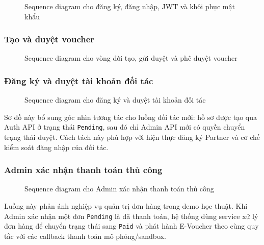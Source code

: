 \begin{figure}[H]
\centering
{}
\caption{Sequence diagram cho đăng ký, đăng nhập, JWT và khôi phục mật khẩu}
\end{figure}

\subsubsection{Tạo và duyệt voucher}

\begin{figure}[H]
\centering
{}
\caption{Sequence diagram cho vòng đời tạo, gửi duyệt và phê duyệt voucher}
\end{figure}

\subsubsection{Đăng ký và duyệt tài khoản đối tác}

\begin{figure}[H]
\centering
{}
\caption{Sequence diagram cho đăng ký và duyệt tài khoản đối tác}
\end{figure}

Sơ đồ này bổ sung góc nhìn tương tác cho luồng đối tác mới: hồ sơ được tạo qua Auth API ở trạng thái \texttt{Pending}, sau đó chỉ Admin API mới có quyền chuyển trạng thái duyệt. Cách tách này phù hợp với hiện thực đăng ký Partner và cơ chế kiểm soát đăng nhập của đối tác.

\subsubsection{Admin xác nhận thanh toán thủ công}

\begin{figure}[H]
\centering
{}
\caption{Sequence diagram cho Admin xác nhận thanh toán thủ công}
\end{figure}

Luồng này phản ánh nghiệp vụ quản trị đơn hàng trong demo học thuật. Khi Admin xác nhận một đơn \texttt{Pending} là đã thanh toán, hệ thống dùng service xử lý đơn hàng để chuyển trạng thái sang \texttt{Paid} và phát hành E-Voucher theo cùng quy tắc với các callback thanh toán mô phỏng/sandbox.

